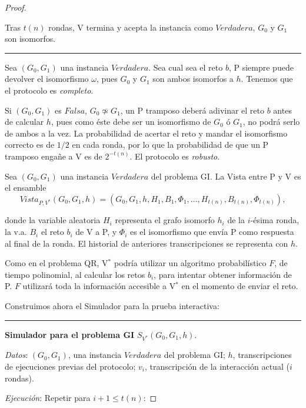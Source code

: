 \begin{proof}
\begin{algorithm}
		Tras $t(n)$ rondas, V termina y acepta la instancia como $Verdadera$, $G_0$ y $G_1$ son isomorfos.
		
		\label{GIinteractive:alg}
	\end{algorithm}
	\rule{\textwidth}{1pt}
	
	\hfil

	Sea $(G_0,G_1)$ una instancia $Verdadera$. Sea cual sea el reto $b$, P siempre puede devolver el isomorfismo $\omega$, pues $G_0$ y $G_1$ son ambos isomorfos a $h$. Tenemos que el protocolo es \textit{completo}.
	
	Si $(G_0,G_1)$ es $Falsa$, $G_0 \not\simeq G_1$, un P tramposo deberá adivinar el reto $b$ antes de calcular $h$, pues como éste debe ser un isomorfismo de $G_0$ ó $G_1$, no podrá serlo de ambos a la vez. La probabilidad de acertar el reto y mandar el isomorfismo correcto es de $1/2$ en cada ronda, por lo que la probabilidad de que un P tramposo engañe a V es de $2^{-t(n)}$. El protocolo es \textit{robusto}.
	
	\hfil
	
	Sea $(G_0, G_1)$ una instancia $Verdadera$ del problema GI. La Vista entre P y V es el ensamble
	\[ Vista_{P,V^*}(G_0, G_1, h) = (G_0, G_1, h,H_1,B_1,\Phi_1,\dots , H_{t(n)}, B_{t(n)}, \Phi_{t(n)}),\]

	donde la variable aleatoria $H_i$ representa el grafo isomorfo $h_i$ de la $i$-ésima ronda, la v.a. $B_i$ el reto $b_i$ de V a P, y $\Phi_i$ es el isomorfismo que envía P como respuesta al final de la ronda. El historial de anteriores transcripciones se representa con $h$.
	
	Como en el problema QR, V$^*$ podría utilizar un algoritmo probabilístico $F$, de tiempo polinomial, al calcular los retos $b_i$, para intentar obtener información de P. $F$ utilizará toda la información accesible a V$^*$ en el momento de enviar el reto.
	
	Construimos ahora el Simulador para la prueba interactiva:
	
	
	\hfil 
	
	\rule{\textwidth}{1pt}
	
	\textbf{Simulador para el problema GI} $S_{V^*}(G_0, G_1 ,h)$.
	
	\hfil
	
	\textit{Datos}: \quad $(G_0, G_1)$, una instancia $Verdadera$ del problema GI; \quad $h$, transcripciones de ejecuciones previas del protocolo; \quad $v_i$, transcripción de la interacción actual ($i$ rondas).
	
	\textit{Ejecución}: Repetir para $i+1 \leq t(n)$:
	

\end{proof}

